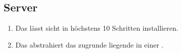 \subsection{Server}

\begin{enumerate}
    \item Das %
        lässt sicht in höchstens 10 Schritten installieren.
    \item Das %
        abstrahiert das zugrunde liegende %
        in einer %
        .
\end{enumerate}